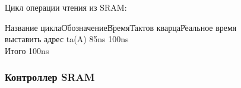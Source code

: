 Цикл операции чтения из SRAM:
\begin{tabbing}
Название цикла\qquad\=Обозначение\qquad\=Время\qquad\=Тактов кварца\qquad\=Реальное время\\
выставить адрес \> ta(A) \> 85ns  \> 100ns \\
Итого \> \>  \> 100ns \\
\end{tabbing}

\subsubsection{Контроллер SRAM}
